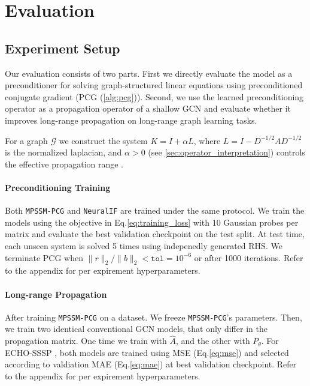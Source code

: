 
\section{Evaluation}
\subsection{Experiment Setup}

Our evaluation consists of two parts. First we directly evaluate the model as
a preconditioner for solving  graph-structured linear equations using
preconditioned conjugate gradient (PCG (\ref{alg:pcg})). Second, we use the learned
preconditioning operator as a propagation operator of a shallow GCN and
evaluate whether it improves long-range propagation on long-range graph
learning tasks.

For a graph $\mathcal G$ we construct the system $K = I + \alpha L$, where $L =
    I - D^{-1/2}AD^{-1/2}$ is the normalized laplacian, and $\alpha > 0$ (see \ref{sec:operator_interpretation}) controls
the effective propagation range .

\paragraph{Preconditioning Training}
Both \texttt{MPSSM-PCG} and \texttt{NeuralIF} are trained under the same
protocol. We train the models using the objective in Eq.\ref{eq:training_loss}
with 10 Gaussian probes per matrix and evaluate the best validation checkpoint
on the test split. At test time, each unseen system is solved 5 times
using indepenedly generated RHS. We terminate PCG when $\lVert
    r\rVert_2 / \lVert b\rVert_2  < \texttt{tol} = 10^{-6}$ or after 1000
iterations. Refer to the appendix for per expirement hyperparameters.

\paragraph{Long-range Propagation}

After training \texttt{MPSSM-PCG} on a dataset. We freeze \texttt{MPSSM-PCG}'s parameters. Then, we
train two identical conventional GCN models, that only differ in the
propagation matrix. One time we train with $\hat A$, and the other with
$P_\theta$. For ECHO-SSSP \cite{migliorCanYouHear2026}, both models are trained using MSE (Eq.\ref{eq:mse})
and selected according to valdiation MAE (Eq.\ref{eq:mae}) at best validation
checkpoint. Refer to the appendix for per expirement hyperparameters.

